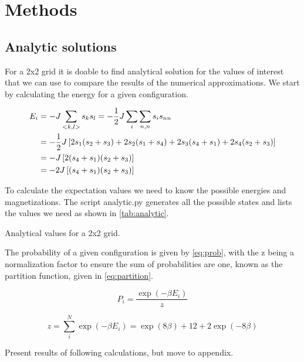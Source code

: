 \section{Methods}


\subsection{Analytic solutions}

For a 2x2 grid it is doable to find analytical solution for the values of
interest that we can use to compare the results of the numerical approximations.
We start by calculating the energy for a given configuration.

\begin{align*}
  E_i &= -J \sum_{<k,l>} s_k s_l = -\frac{1}{2}J \sum_{i} \sum_{n,n} s_i s_{nn} \\
      &= -\frac{1}{2} J \left[2 s_1 (s_2 + s_3) + 2s_2(s_1 + s_4) + 2s_3(s_4 + s_1) + 2s_4 (s_2 + s_3)\right]\\
      &= -J\left[ 2(s_4 + s_1)(s_2 + s_3)\right] \\
      &= -2J\left[(s_4 + s_1)(s_2+s_3)\right]
\end{align*}

To calculate the expectation values we need to know the possible energies and
magnetizations. The script analytic.py \parencite{github} generates all the
possible states and lists the values we need as shown in \cref{tab:analytic}.

\begin{table}[htp]
  \centering
  \caption{Analytical values for a 2x2 grid.}
  \label{tab:analytic}
\end{table}

The probability of a given configuration is given by \cref{eq:prob}, with
the z being a normalization factor to ensure the sum of probabilities are one,
known as the partition function, given in \cref{eq:partition}.


\begin{equation}
  P_i = \frac{\exp(-\beta E_i)}{z}
  \label{eq:prob}
\end{equation}

\begin{equation}
  \label{eq:partition}
  z = \sum_{i}^{N} \exp(-\beta E_i) = \exp(8\beta) + 12 + 2\exp(-8\beta)
\end{equation}



Present results of following calculations, but move to appendix.
\newpage

